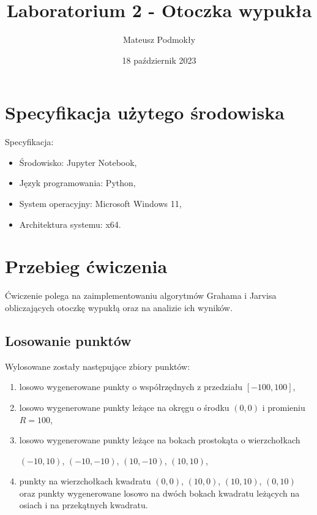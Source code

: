 \documentclass[11pt]{scrartcl}
\title{Laboratorium 2 - Otoczka wypukła}
\author{Mateusz Podmokły}
\date{18 październik 2023}
\begin{document}
    \maketitle
    \section{Specyfikacja użytego środowiska}
    Specyfikacja:

    \begin{itemize}
        \item Środowisko: Jupyter Notebook,
        \item Język programowania: Python,
        \item System operacyjny: Microsoft Windows 11,
        \item Architektura systemu: x64.
    \end{itemize}
    \section{Przebieg ćwiczenia}

    Ćwiczenie polega na zaimplementowaniu algorytmów Grahama i Jarvisa obliczających
    otoczkę wypukłą oraz na analizie ich wyników.

    \subsection{Losowanie punktów}

    Wylosowane zostały następujące zbiory punktów:

    \begin{enumerate}
        \item losowo wygenerowane punkty o współrzędnych z przedziału
        \([-100,100]\),
        \item losowo wygenerowane punkty leżące na okręgu o środku
        \((0,0)\) i promieniu $R=100$,
        \item losowo wygenerowane punkty leżące na bokach prostokąta
        o wierzchołkach
        
        $(-10, 10)$, $(-10,-10)$, $(10,-10)$, $(10,10)$,
        \item punkty na wierzchołkach kwadratu $(0, 0)$, $(10, 0)$, $(10, 10)$,
        $(0, 10)$ oraz punkty wygenerowane losowo na dwóch bokach kwadratu
        leżących na osiach i na przekątnych kwadratu.
    \end{enumerate}
\end{document}
